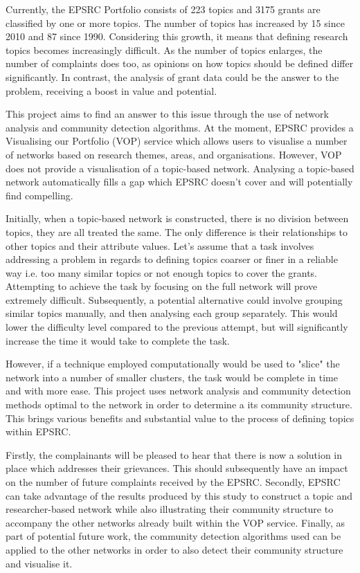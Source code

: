 Currently, the EPSRC Portfolio consists of 223 topics and 3175 grants are classified by one or more topics. The number of topics has increased by 15 since 2010 and 87 since 1990. Considering this growth, it means that defining research topics becomes increasingly difficult. As the number of topics enlarges, the number of complaints does too, as opinions on how topics should be defined differ significantly. In contrast, the analysis of grant data could be the answer to the problem, receiving a boost in value and potential.

This project aims to find an answer to this issue through the use of network analysis and community detection algorithms. At the moment, EPSRC provides a Visualising our Portfolio (VOP) service which allows users to visualise a number of networks based on research themes, areas, and organisations. However, VOP does not provide a visualisation of a topic-based network. Analysing a topic-based network automatically fills a gap which EPSRC doesn't cover and will potentially find compelling.

Initially, when a topic-based network is constructed, there is no division between topics, they are all treated the same. The only difference is their relationships to other topics and their attribute values. Let's assume that a task involves addressing a problem in regards to defining topics coarser or finer in a reliable way i.e. too many similar topics or not enough topics to cover the grants. Attempting to achieve the task by focusing on the full network will prove extremely difficult. Subsequently, a potential alternative could involve grouping similar topics manually, and then analysing each group separately. This would lower the difficulty level compared to the previous attempt, but will significantly increase the time it would take to complete the task.

However, if a technique employed computationally would be used to "slice" the network into a number of smaller clusters, the task would be complete in time and with more ease. This project uses network analysis and community detection methods optimal to the network in order to determine a its community structure. This brings various benefits and substantial value to the process of defining topics within EPSRC.

Firstly, the complainants will be pleased to hear that there is now a solution in place which addresses their grievances. This should subsequently have an impact on the number of future complaints received by the EPSRC. Secondly, EPSRC can take advantage of the results produced by this study to construct a topic and researcher-based network while also illustrating their community structure to accompany the other networks already built within the VOP service. Finally, as part of potential future work, the community detection algorithms used can be applied to the other networks in order to also detect their community structure and visualise it.
\fi

